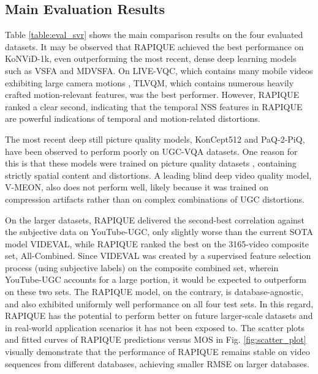 \documentclass[transmag]{IEEEtran}
\begin{document}
\subsection{Main Evaluation Results}
\label{ssec:main_evaluation_results}

Table \ref{table:eval_svr} shows the main comparison results on the four evaluated datasets. It may be observed that RAPIQUE achieved the best performance on KoNViD-1k, even outperforming the most recent, dense deep learning models such as VSFA and MDVSFA. On LIVE-VQC, which contains many mobile videos exhibiting large camera motions \cite{tu2020ugc}, TLVQM, which contains numerous heavily crafted motion-relevant features, was the best performer. However, RAPIQUE ranked a clear second, indicating that the temporal NSS features in RAPIQUE are powerful indications of temporal and motion-related distortions.

The most recent deep still picture quality models, KonCept512 and PaQ-2-PiQ, have been observed to perform poorly on UGC-VQA datasets. One reason for this is that these models were trained on picture quality datasets \cite{ying2019patches, hosu2020koniq}, containing strictly spatial content and distortions. A leading blind deep video quality model, V-MEON, also does not perform well, likely because it was trained on compression artifacts rather than on complex combinations of UGC distortions.

On the larger datasets, RAPIQUE delivered the second-best correlation against the subjective data on YouTube-UGC, only slightly worse than the current SOTA model VIDEVAL, while RAPIQUE ranked the best on the 3165-video composite set, All-Combined. Since VIDEVAL was created by a supervised feature selection process (using subjective labels) on the composite combined set, wherein YouTube-UGC accounts for a large portion, it would be expected to outperform on these two sets. The RAPIQUE model, on the contrary, is database-agnostic, and also exhibited uniformly well performance on all four test sets. In this regard, RAPIQUE has the potential to perform better on future larger-scale datasets and in real-world application scenarios it has not been exposed to. The scatter plots and fitted curves of RAPIQUE predictions versus MOS in Fig. \ref{fig:scatter_plot} visually demonstrate that the performance of RAPIQUE remains stable on video sequences from different databases, achieving smaller RMSE on larger databases. 
\end{document}
